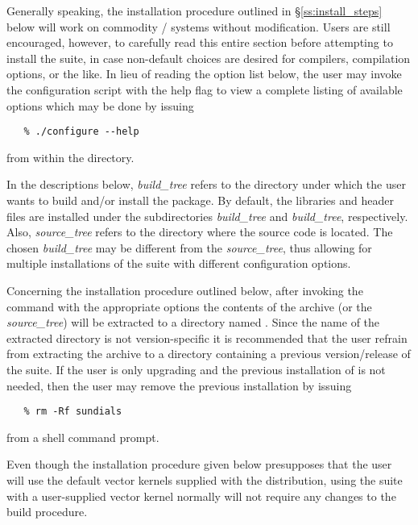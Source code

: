 Generally speaking, the installation procedure outlined in
\S\ref{ss:install_steps} below will work on commodity {\linux}/{\unix} systems
without modification. Users are still encouraged, however, to carefully read
this entire section before attempting to install the {\sundials} suite, in case
non-default choices are desired for compilers, compilation options, or the like.
In lieu of reading the option list below, the user may invoke the configuration
script with the help flag to view a complete listing of available options which
may be done by issuing 
\begin{verbatim}
   % ./configure --help 
\end{verbatim}
from within the  directory.

In the descriptions below, {\em build\_tree} refers to the directory under
which the user wants to build and/or install the {\sundials} package. By
default, the {\sundials} libraries and header files are installed under the
subdirectories {\em build\_tree} and {\em build\_tree},
respectively. Also, {\em source\_tree} refers to the directory where the
{\sundials} source code is located. The chosen {\em build\_tree} may be
different from the {\em source\_tree}, thus allowing for multiple installations
of the {\sundials} suite with different configuration options.

Concerning the installation procedure outlined below, after invoking the
 command with the appropriate options the contents of the
{\sundials} archive (or the {\em source\_tree}) will be extracted to a
directory named . Since the name of the extracted directory
is not version-specific it is recommended that the user refrain from
extracting the archive to a directory containing a previous version/release
of the {\sundials} suite. If the user is only upgrading and the previous 
installation of {\sundials} is not needed, then the user may remove the
previous installation by issuing 
\begin{verbatim}
   % rm -Rf sundials
\end{verbatim}
from a shell command prompt.

Even though the installation procedure given below presupposes that the user
will use the default vector kernels supplied with the distribution, using the
{\sundials} suite with a user-supplied vector kernel normally will not require
any changes to the build procedure.  


